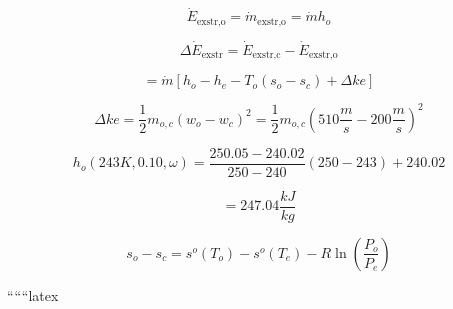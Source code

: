 \[
\dot{E}_{\text{exstr,o}} = \dot{m}_{\text{exstr,o}} = \dot{m} h_{o}
\]

\[
\Delta \dot{E}_{\text{exstr}} = \dot{E}_{\text{exstr,c}} - \dot{E}_{\text{exstr,o}}
\]

\[
= \dot{m} \left[ h_{o} - h_{e} - T_{o}(s_{o} - s_{c}) + \Delta ke \right]
\]

\[
\Delta ke = \frac{1}{2} m_{o,c} (w_{o} - w_{c})^{2} = \frac{1}{2} m_{o,c} \left( 510 \frac{m}{s} - 200 \frac{m}{s} \right)^{2}
\]

\[
h_{o} (243K, 0.10, \omega) = \frac{250.05 - 240.02}{250 - 240} (250 - 243) + 240.02
\]

\[
= 247.04 \frac{kJ}{kg}
\]

\[
s_{o} - s_{c} = s^{o}(T_{o}) - s^{o}(T_{e}) - R \ln \left( \frac{P_{o}}{P_{e}} \right)
\]

``````latex


